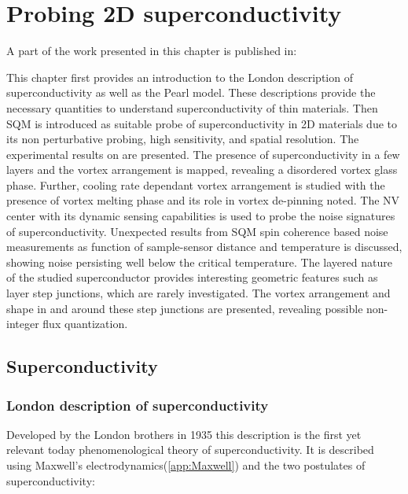 \chapter{Probing 2D superconductivity}\label{sec:fabrication}
\begin{flushright}
    \begin{minipage}{0.85\textwidth}
        \small
        A part of the work presented in this chapter is published in: \\
    \end{minipage}
\end{flushright}

This chapter first provides an introduction to the London description of superconductivity as well as the Pearl model. These descriptions provide the necessary quantities to understand superconductivity of thin materials. Then \gls{SQM} is introduced as suitable probe of superconductivity in 2D materials due to its non perturbative probing, high sensitivity, and spatial resolution. The experimental results on  are presented. The presence of superconductivity in a few layers and the vortex arrangement is mapped, revealing a disordered vortex glass phase. Further, cooling rate dependant vortex arrangement is studied with the presence of vortex melting phase and its role in vortex de-pinning noted. The \gls{NV} center with its dynamic sensing capabilities is used to probe the noise signatures of superconductivity. Unexpected results from \gls{SQM} spin coherence based noise measurements as function of sample-sensor distance and temperature is discussed, showing noise persisting well below the critical temperature. The layered nature of the studied superconductor provides interesting geometric features such as layer step junctions, which are rarely investigated. The vortex arrangement and shape in and around these step junctions are presented, revealing possible non-integer flux quantization.

\section{Superconductivity}

\subsection*{London description of superconductivity\footnotemark}
Developed by the London brothers in 1935\cite{londonElectromagneticEquationsSupraconductor1935} this description is the first yet relevant today phenomenological theory of superconductivity. It is described using Maxwell's electrodynamics(\ref{app:Maxwell}) and the two postulates of superconductivity:

